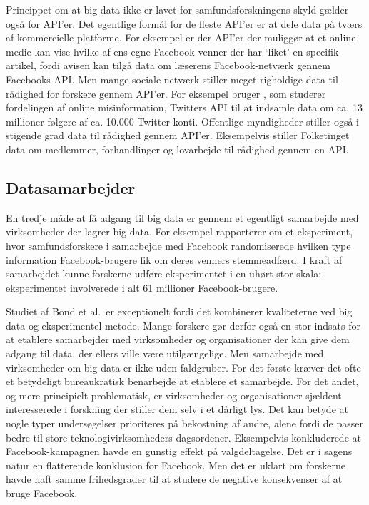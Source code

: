 \documentclass[12pt,]{article}
\begin{document}
Princippet om at big data ikke er lavet for samfundsforskningens skyld
gælder også for API'er. Det egentlige formål for de fleste API'er er at
dele data på tværs af kommercielle platforme. For eksempel er der API'er
der muliggør at et online-medie kan vise hvilke af ens egne
Facebook-venner der har `liket' en specifik artikel, fordi avisen kan
tilgå data om læserens Facebook-netværk gennem Facebooks API. Men mange
sociale netværk stiller meget righoldige data til rådighed for forskere
gennem API'er. For eksempel bruger \citet{hjorth2019}, som studerer
fordelingen af online misinformation, Twitters API til at indsamle data
om ca. 13 millioner følgere af ca. 10.000 Twitter-konti. Offentlige
myndigheder stiller også i stigende grad data til rådighed gennem
API'er. Eksempelvis stiller Folketinget data om medlemmer, forhandlinger
og lovarbejde til rådighed gennem en API.

\hypertarget{datasamarbejder}{%
\subsection{Datasamarbejder}\label{datasamarbejder}}

En tredje måde at få adgang til big data er gennem et egentligt
samarbejde med virksomheder der lagrer big data. For eksempel
rapporterer \citet{bond2012} om et eksperiment, hvor samfundsforskere i
samarbejde med Facebook randomiserede hvilken type information
Facebook-brugere fik om deres venners stemmeadfærd. I kraft af
samarbejdet kunne forskerne udføre eksperimentet i en uhørt stor skala:
eksperimentet involverede i alt 61 millioner Facebook-brugere.

Studiet af Bond et al.~er exceptionelt fordi det kombinerer kvaliteterne
ved big data og eksperimentel metode. Mange forskere gør derfor også en
stor indsats for at etablere samarbejder med virksomheder og
organisationer der kan give dem adgang til data, der ellers ville være
utilgængelige. Men samarbejde med virksomheder om big data er ikke uden
faldgruber. For det første kræver det ofte et betydeligt bureaukratisk
benarbejde at etablere et samarbejde. For det andet, og mere principielt
problematisk, er virksomheder og organisationer sjældent interesserede i
forskning der stiller dem selv i et dårligt lys. Det kan betyde at nogle
typer undersøgelser prioriteres på bekostning af andre, alene fordi de
passer bedre til store teknologivirksomheders dagsordener. Eksempelvis
konkluderede \citet{bond2012} at Facebook-kampagnen havde en gunstig
effekt på valgdeltagelse. Det er i sagens natur en flatterende
konklusion for Facebook. Men det er uklart om forskerne havde haft samme
frihedsgrader til at studere de negative konsekvenser af at bruge
Facebook.
\end{document}
